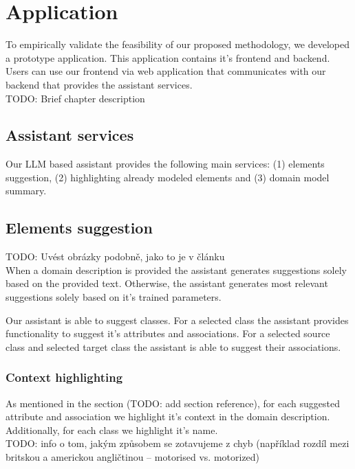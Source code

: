 \section{Application}

To empirically validate the feasibility of our proposed methodology, we developed a prototype application. This application contains it's frontend and backend. Users can use our frontend via web application that communicates with our backend that provides the assistant services. \\

TODO: Brief chapter description \\

\subsection{Assistant services}

Our LLM based assistant provides the following main services: (1) elements suggestion, (2) highlighting already modeled elements and (3) domain model summary.

\subsection{Elements suggestion}

TODO: Uvést obrázky podobně, jako to je v článku \\

When a domain description is provided the assistant generates suggestions solely based on the provided text. Otherwise, the assistant generates most relevant suggestions solely based on it's trained parameters.

Our assistant is able to suggest classes. For a selected class the assistant provides functionality to suggest it's attributes and associations. For a selected source class and selected target class the assistant is able to suggest their associations.


\subsubsection{Context highlighting}

As mentioned in the section (TODO: add section reference), for each suggested attribute and association we highlight it's context in the domain description. Additionally, for each class we highlight it's name. \\

TODO: info o tom, jakým způsobem se zotavujeme z chyb (například rozdíl mezi britskou a americkou angličtinou -- motorised vs. motorized) \\


